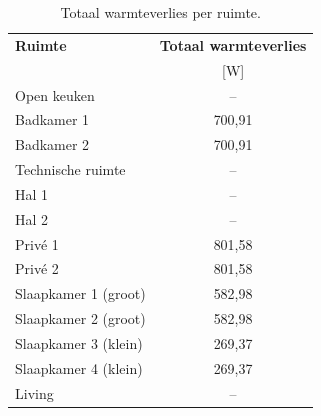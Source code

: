 \documentclass[a4paper,12pt]{article}
\begin{document}
\begin{table}[H]
\centering
\small
\caption{Totaal warmteverlies per ruimte.}
\label{tab:warmteverlies}

\begin{tabularx}{0.6\textwidth}{X c}
\toprule
\rowcolor{gray!20}
\textbf{Ruimte} & \textbf{Totaal warmteverlies} \\

\rowcolor{gray!20}
& \scriptsize[W] \\
\midrule

Open keuken & -- \\

Badkamer 1 & 700,91 \\

Badkamer 2 & 700,91 \\

Technische ruimte & -- \\

Hal 1 & -- \\

Hal 2 & -- \\

Privé 1 & 801,58 \\

Privé 2 & 801,58 \\

Slaapkamer 1 (groot) & 582,98 \\

Slaapkamer 2 (groot) & 582,98 \\

Slaapkamer 3 (klein) & 269,37 \\

Slaapkamer 4 (klein) & 269,37 \\

Living & -- \\

\bottomrule
\end{tabularx}
\end{table}
\end{document}
